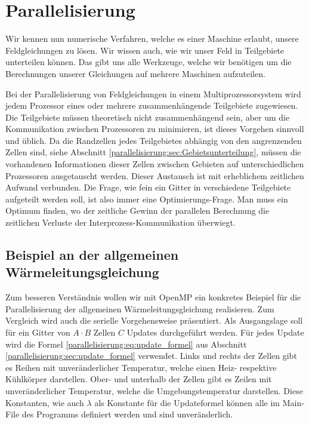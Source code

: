 %
%
%
%
\section{Parallelisierung
	\label{parallelisierung:sec:Parallelisierung}}
Wir kennen nun numerische Verfahren, welche es einer Maschine erlaubt, unsere Feldgleichungen zu lösen.
Wir wissen auch, wie wir unser Feld in Teilgebiete unterteilen können.
Das gibt uns alle Werkzeuge, welche wir benötigen um die Berechnungen unserer Gleichungen auf mehrere Maschinen aufzuteilen.

Bei der Parallelisierung von Feldgleichungen in einem Multiprozessorsystem wird jedem Prozessor eines oder mehrere zusammenhängende Teilgebiete zugewiesen.
Die Teilgebiete müssen theoretisch nicht zusammenhängend sein, aber um die Kommunikation zwischen Prozessoren zu minimieren, ist dieses Vorgehen sinnvoll und üblich.
Da die Randzellen jedes Teilgebietes abhängig von den angrenzenden Zellen sind, siehe Abschnitt \ref{parallelisierung:sec:Gebietsunterteilung}, müssen die vorhandenen Informationen dieser Zellen zwischen Gebieten auf unterschiedlichen Prozessoren ausgetauscht werden.
Dieser Austausch ist mit erheblichem zeitlichen Aufwand verbunden.
Die Frage, wie fein ein Gitter in verschiedene Teilgebiete aufgeteilt werden soll, ist also immer eine Optimierungs-Frage.
Man muss ein Optimum finden, wo der zeitliche Gewinn der parallelen Berechnung die zeitlichen Verluste der Interprozess-Kommunikation überwiegt.




\subsection{Beispiel an der allgemeinen Wärmeleitungsgleichung
	\label{parallelisierung:sub:BeispielParallelisierung}}
Zum besseren Verständnis wollen wir mit OpenMP ein konkretes Beispiel für die Parallelisierung der allgemeinen Wärmeleitungsgleichung realisieren.
Zum Vergleich wird auch die serielle Vorgehensweise präsentiert.
Als Ausgangslage soll für ein Gitter von $A \cdot B$ Zellen $C$ Updates durchgeführt werden.
Für jedes Update wird die Formel \eqref{parallelisierung:eq:update_formel} aus Abschnitt \ref{parallelisierung:sec:update_formel} verwendet.
Links und rechts der Zellen gibt es Reihen mit unveränderlicher Temperatur, welche einen Heiz- respektive Kühlkörper darstellen.
Ober- und unterhalb der Zellen gibt es Zeilen mit unveränderlicher Temperatur, welche die Umgebungstemperatur darstellen.
Diese Konstanten, wie auch $\lambda$ als Konstante für die Updateformel können alle im Main-File des Programms definiert werden und sind unveränderlich.

